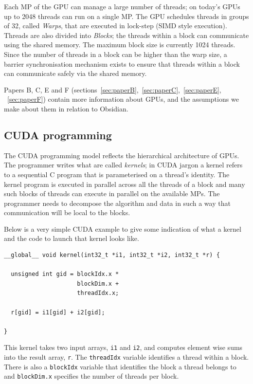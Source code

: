 \documentclass[a4paper]{book}
\begin{document}
Each MP of the GPU can manage a large number of threads; on today's GPUs up to 
2048 threads can run on a single MP. The GPU schedules threads in groups of 32, called 
{\em Warps}, that are executed in lock-step (SIMD style execution). Threads are 
also divided into {\em Blocks}; the threads within a block can communicate using the 
shared memory. The maximum block size is currently 1024 threads. Since 
the number of threads in a block can be higher than the warp size, a barrier 
synchronisation mechanism exists to ensure that threads within a block 
can communicate safely via the shared memory. 


Papers B, C, E and F (sections~\ref{sec:paperB},~\ref{sec:paperC},~\ref{sec:paperE},
~\ref{sec:paperF}) contain more information about GPUs, and the assumptions we make 
about them in relation to Obsidian. 

\subsection{CUDA programming} 

The CUDA programming model reflects the hierarchical architecture of GPUs. The programmer 
writes what are called {\em kernels}; in CUDA jargon a kernel refers to a sequential C program 
that is parameterised on a thread's identity. The kernel program is executed in parallel across 
all the threads of a block and many such blocks of threads can execute in parallel on the 
available MPs. The programmer needs to decompose the algorithm and data in such a way that 
communication will be local to the blocks. 

Below is a very simple CUDA example to give some indication of what a kernel and 
the code to launch that kernel looks like. 

\begin{small}
\begin{Verbatim}[samepage=true]
__global__ void kernel(int32_t *i1, int32_t *i2, int32_t *r) {
  
  unsigned int gid = blockIdx.x * 
                     blockDim.x + 
                     threadIdx.x;

  r[gid] = i1[gid] + i2[gid]; 

} 

\end{Verbatim}
\end{small}

This kernel takes two input arrays, {\tt i1} and {\tt i2}, and computes 
element wise sums into the result array, {\tt r}. The {\tt threadIdx} variable identifies 
a thread within a block. There is also a {\tt blockIdx} variable that identifies 
the block a thread belongs to and {\tt blockDim.x} specifies the number of threads per block. 
\end{document}
